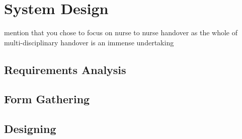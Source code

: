 \section{System Design}
mention that you chose to focus on nurse to nurse handover as the whole of multi-disciplinary handover is an immense undertaking
\subsection{Requirements Analysis}

\subsection{Form Gathering}

\subsection{Designing}

